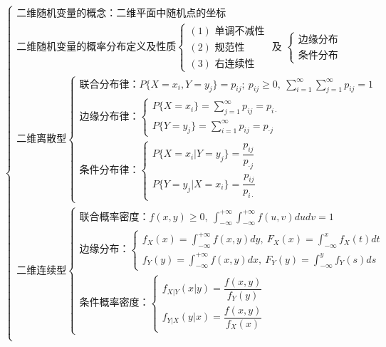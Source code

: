 ﻿\documentclass[lang=cn,11pt]{elegantbook}
\begin{document}
\[
\begin{cases}
\text{二维随机变量的概念：二维平面中随机点的坐标} \\
\text{二维随机变量的概率分布定义及性质}
\begin{cases}
(1) \text{ 单调不减性} \\
(2) \text{ 规范性} \\
(3) \text{ 右连续性}
\end{cases}
\text{ 及 }
\begin{cases}
\text{边缘分布} \\
\text{条件分布}
\end{cases} \\[6pt]

\text{二维离散型}
\begin{cases}
\text{联合分布律：} P\{X=x_i,Y=y_j\}=p_{ij};\ p_{ij}\geqslant0,\ \sum\limits_{i=1}^{\infty}\sum\limits_{j=1}^{\infty}p_{ij}=1 \\[8pt]
\text{边缘分布律：}
\begin{cases}
P\{X=x_i\}=\sum\limits_{j=1}^{\infty}p_{ij}=p_{i\cdot} \\[8pt]
P\{Y=y_j\}=\sum\limits_{i=1}^{\infty}p_{ij}=p_{\cdot j}
\end{cases} \\[12pt]
\text{条件分布律：}
\begin{cases}
P\{X=x_i|Y=y_j\}=\dfrac{p_{ij}}{p_{\cdot j}} \\[8pt]
P\{Y=y_j|X=x_i\}=\dfrac{p_{ij}}{p_{i\cdot}}
\end{cases}
\end{cases} \\[18pt]

\text{二维连续型}
\begin{cases}
\text{联合概率密度：} f(x,y)\geqslant0,\ \displaystyle\int_{-\infty}^{+\infty}\int_{-\infty}^{+\infty}f(u,v)dudv=1 \\[12pt]
\text{边缘分布：}
\begin{cases}
f_X(x)=\displaystyle\int_{-\infty}^{+\infty}f(x,y)dy,\ F_X(x)=\displaystyle\int_{-\infty}^{x}f_X(t)dt \\[12pt]
f_Y(y)=\displaystyle\int_{-\infty}^{+\infty}f(x,y)dx,\ F_Y(y)=\displaystyle\int_{-\infty}^{y}f_Y(s)ds
\end{cases} \\[18pt]
\text{条件概率密度：}
\begin{cases}
f_{X|Y}(x|y)=\dfrac{f(x,y)}{f_Y(y)} \\[8pt]
f_{Y|X}(y|x)=\dfrac{f(x,y)}{f_X(x)}
\end{cases}
\end{cases} \\[18pt]


\end{cases}\]
\end{document}
